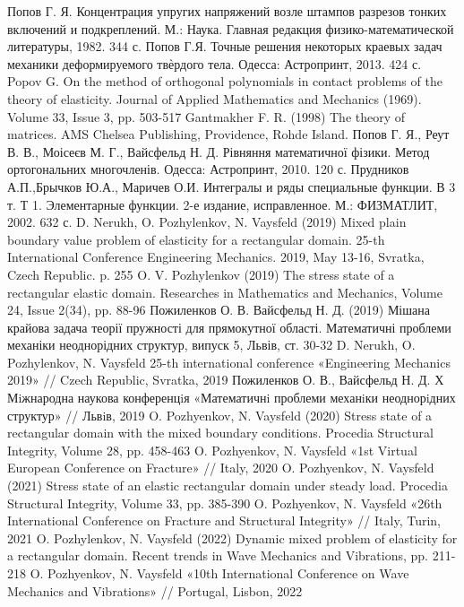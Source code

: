 \documentclass[a4paper,14pt]{extarticle}
\numberwithin{equation}{section}
\begin{document}
\begin{thebibliography}{1}
    Попов Г. Я. Концентрация упругих напряжений возле штампов разрезов тонких включений и подкреплений. М.: Наука. Главная редакция физико-математической литературы, 1982. 344 с.
    Попов Г.Я. Точные решения некоторых краевых задач механики деформируемого твѐрдого тела. Одесса: Астропринт, 2013. 424 с.
    Popov G. On the method of orthogonal polynomials in contact problems of the theory of elasticity. Journal of Applied Mathematics and Mechanics (1969). Volume 33, Issue 3, pp. 503-517
    Gantmakher F. R. (1998) The theory of matrices. AMS Chelsea Publishing, Providence, Rohde Island.
    Попов Г. Я., Реут В. В., Моісеєв М. Г., Вайсфельд Н. Д. Рівняння математичної фізики. Метод ортогональних многочленів. Одесса: Астропринт, 2010. 120 с.
    Прудников А.П.,Брычков Ю.А., Маричев О.И. Интегралы и ряды специальные функции. В 3 т. Т 1. Элементарные функции. 2-е издание, исправленное. М.: ФИЗМАТЛИТ, 2002. 632 с.
    D. Nerukh, O. Pozhylenkov, N. Vaysfeld (2019) Mixed plain boundary value problem of elasticity for a rectangular domain. 25-th International Conference Engineering Mechanics. 2019, May 13-16, Svratka, Czech Republic. p. 255
    O. V. Pozhylenkov (2019) The stress state of a rectangular elastic domain. Researches in Mathematics and Mechanics, Volume 24, Issue 2(34), pp. 88-96
    Пожиленков О. В. Вайсфельд Н. Д. (2019) Мішана крайова задача теорії пружності для прямокутної області. Математичні проблеми механіки неоднорідних структур, випуск 5, Львів, ст. 30-32
    D. Nerukh, O. Pozhylenkov, N. Vaysfeld 25-th international conference «Engineering Mechanics 2019» // Czech Republic, Svratka, 2019
    Пожиленков О. В., Вайсфельд Н. Д. Х Мiжнародна наукова конференцiя «Математичнi проблеми механiки неоднорiдних структур» // Львiв, 2019
    O. Pozhyenkov, N. Vaysfeld (2020) Stress state of a rectangular domain with the mixed boundary conditions. Procedia Structural Integrity, Volume 28, pp. 458-463
    O. Pozhyenkov, N. Vaysfeld «1st Virtual European Conference on Fracture» // Italy, 2020
    O. Pozhyenkov, N. Vaysfeld (2021) Stress state of an elastic rectangular domain under steady load. Procedia Structural Integrity, Volume 33, pp. 385-390
    O. Pozhyenkov, N. Vaysfeld «26th International Conference on Fracture and Structural Integrity» // Italy, Turin, 2021
    O. Pozhylenkov, N. Vaysfeld (2022) Dynamic mixed problem of elasticity for a rectangular domain. Recent trends in Wave Mechanics and Vibrations, pp. 211-218
    O. Pozhyenkov, N. Vaysfeld «10th International Conference on Wave Mechanics and Vibrations» // Portugal, Lisbon, 2022
\end{thebibliography}
\end{document}
